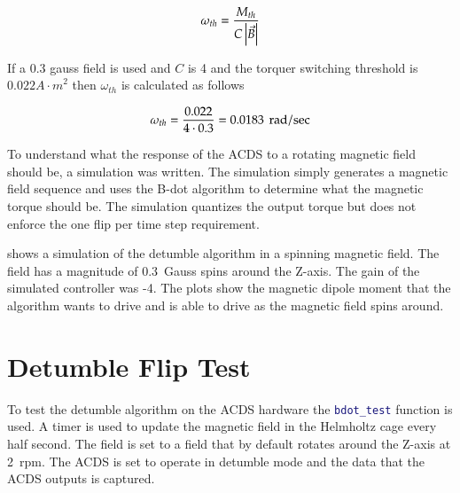 
\begin{equation}
    \omega _ {th} = {M _ {th} \over{ {C \left| \vec{B} \right|}}}
    \label{eq:omega-th}
\end{equation}

If a 0.3 gauss field is used and $C$ is 4 and the torquer switching threshold is $0.022 \unit{A \cdot m} ^2$ then $\omega_{th}$ is calculated as follows

\begin{equation}
    \omega _ {th} = { 0.022 \over{ {4 \cdot 0.3}}} = 0.0183 ~ \, \mathrm{rad / sec}
\end{equation}

To understand what the response of the \ac{ACDS} to a rotating magnetic field should be, a simulation was written. The simulation simply generates a magnetic field sequence and uses the B-dot algorithm to determine what the magnetic torque should be. The simulation quantizes the output torque but does not enforce the one flip per time step requirement.


 shows a simulation of the detumble algorithm in a spinning magnetic field. The field has a magnitude of 0.3~Gauss spins around the Z-axis. The gain of the simulated controller was -4. The plots show the magnetic dipole moment that the algorithm wants to drive and is able to drive as the magnetic field spins around.


\section{Detumble Flip Test}

To test the detumble algorithm on the \ac{ACDS} hardware the \lstinline[style=code,language=Matlab]$bdot_test$ function is used. A timer is used to update the magnetic field in the Helmholtz cage every half second. The field is set to a field that by default rotates around the Z-axis at 2~rpm. The \ac{ACDS} is set to operate in detumble mode and the data that the \ac{ACDS} outputs is captured.

